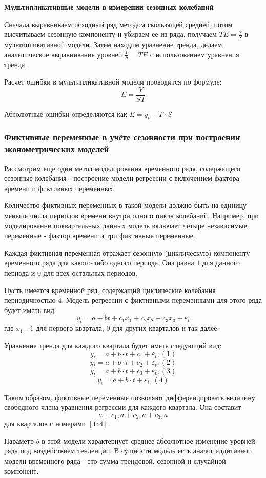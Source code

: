 \documentclass[aps,%
12pt,%
final,%
oneside,
onecolumn,%
musixtex, %
superscriptaddress,%
centertags]{article} %
\theoremstyle{plain}
\theoremstyle{definition}
\theoremstyle{remark}
\begin{document}
\textbf{Мультипликативные модели в измерении сезонных колебаний}

Сначала выравниваем исходный ряд методом скользящей средней, потом высчитываем сезонную компоненту и убираем ее из ряда, получаем $TE = \frac{Y}{S}$ в мультипликативной модели. Затем находим уравнение тренда, делаем аналитическое выравнивание уровней $\frac{Y}{S} = TE$ с использованием уравнения тренда. 

Расчет ошибки в мультипликативной модели проводится по формуле:
$$E = \frac{Y}{ST}$$

Абсолютные ошибки определяются как $E = y_t - T\cdot S$
\subsubsection{Фиктивные переменные в учёте сезонности при построении эконометрических моделей}

Рассмотрим еще один метод моделирования временного радя, содержащего сезонные колебания - построение модели регрессии с включением фактора времени и фиктивных переменных.

Количество фиктивных переменных в такой модели должно быть на единицу меньше числа периодов времени внутри одного цикла колебаний. Например, при моделированни поквартальных данных модель включает четыре независимые переменные - фактор времени и три фиктивные переменные.

Каждая фиктивная переменная отражает сезонную (циклическую) компоненту временного ряда для какого-либо одного периода. Она равна $1$ для данного периода и $0$ для всех остальных периодов.

Пусть имеется временной ряд, содержащий циклические колебания периодичностью $4$. Модель регрессии с фиктивными переменными для этого ряда будет иметь вид:
$$y_t = a + bt + c_1x_1+ c_2x_2 + c_3x_3 + \varepsilon_t$$
где $x_1$ - $1$ для первого квартала, $0$ для других кварталов и так далее.

Уравнение тренда для каждого квартала будет иметь следующий вид:
$$y_t = a + b\cdot t + c_1 + \varepsilon_t, (1)$$
$$y_t = a + b\cdot t + c_2 + \varepsilon_t, (2)$$
$$y_t = a + b\cdot t + c_3 + \varepsilon_t, (3)$$
$$y_t = a + b\cdot t + \varepsilon_t, (4)$$

Таким образом, фиктивные переменные позволяют дифференцировать величину свободного члена уравнения регрессии для каждого квартала. Она составит:
$$a+c_1,a+c_2,a+c_3,a$$
для кварталов с номерами $[1:4]$.

Параметр $b$ в этой модели характериует среднее абсолютное изменение уровней ряда под воздействием тенденции. В сущности модель есть аналог аддитивной модели временного ряда - это сумма трендовой, сезонной и случайной компонент.
\end{document}

